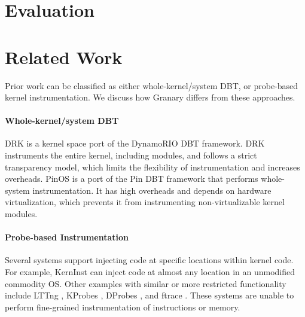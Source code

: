 \documentclass[preprint]{sigplanconf}
\begin{document}
%

\section{Evaluation}\label{sec:eval}


\section{Related Work}\label{sec:related}
Prior work can be classified as either whole-kernel/system DBT, or probe-based kernel instrumentation. We discuss how Granary differs from these approaches.
\vspace{-3pt}\paragraph{Whole-kernel/system DBT} DRK \cite{DRK} is a kernel space port of the DynamoRIO \cite{DynamoRIO} DBT framework. DRK instruments the entire kernel, including modules, and follows a strict transparency model, which limits the flexibility of instrumentation and increases overheads.  PinOS \cite{PinOS} is a port of the Pin \cite{Pin} DBT framework that performs whole-system instrumentation. It has high overheads and depends on hardware virtualization, which prevents it from instrumenting non-virtualizable kernel modules. 

\vspace{-3pt}\paragraph{Probe-based Instrumentation} Several systems support injecting code at specific locations within kernel code. For example, KernInst \cite{KernInst} can inject code at almost any location in an unmodified commodity OS. Other examples with similar or more restricted functionality include LTTng \cite{LTTng}, KProbes \cite{KProbes}, DProbes \cite{DProbes}, and ftrace \cite{ftrace}. These systems are unable to perform fine-grained instrumentation of instructions or memory.
\end{document}
